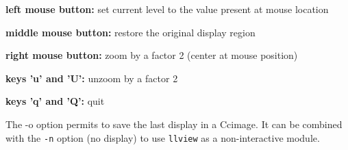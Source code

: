 \medskip

{\bf left mouse button:} set current level to the value present at mouse location

{\bf middle mouse button:} restore the original display region

{\bf right mouse button:} zoom by a factor 2 (center at mouse position)

{\bf keys 'u' and 'U':} unzoom by a factor 2

{\bf keys 'q' and 'Q':} quit 

\medskip

The -o option permits to save the last display in a Ccimage.
It can be combined with the \verb+-n+ option (no display) to
use \verb+llview+ as a non-interactive module.


